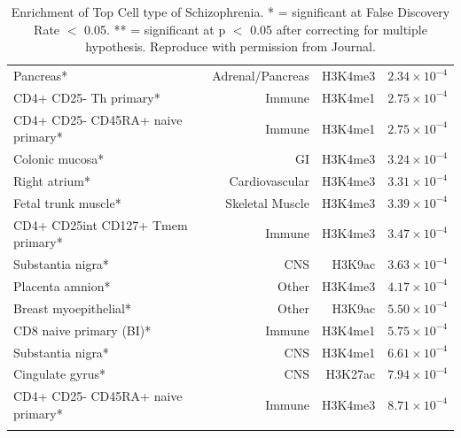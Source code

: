 \documentclass[12pt]{book}
\begin{document}
\begin{singlespace}
\begin{longtable}{p{6cm}rrr}
			Pancreas* & Adrenal/Pancreas & H3K4me3 & $2.34\times 10^{-4}$ \\
			CD4+ CD25- Th primary* & Immune & H3K4me1 & $2.75\times 10^{-4}$ \\
			CD4+ CD25- CD45RA+ naive primary* & Immune & H3K4me1 & $2.75\times 10^{-4}$\\
			Colonic mucosa* & GI    & H3K4me3 & $3.24\times 10^{-4}$ \\
			Right atrium* & Cardiovascular & H3K4me3 & $3.31\times 10^{-4}$ \\
			Fetal trunk muscle* & Skeletal Muscle & H3K4me3 & $3.39\times 10^{-4}$ \\
			CD4+ CD25int CD127+ Tmem primary* & Immune & H3K4me3 & $3.47\times 10^{-4}$ \\
			Substantia nigra* & CNS   & H3K9ac & $3.63\times 10^{-4}$ \\
			Placenta amnion* & Other & H3K4me3 & $4.17\times 10^{-4}$ \\
			Breast myoepithelial* & Other & H3K9ac & $5.50\times 10^{-4}$ \\
			CD8 naive primary (BI)* & Immune & H3K4me1 & $5.75\times 10^{-4}$ \\
			Substantia nigra* & CNS   & H3K4me1 & $6.61\times 10^{-4}$ \\
			Cingulate gyrus* & CNS   & H3K27ac & $7.94\times 10^{-4}$ \\
			CD4+ CD25- CD45RA+ naive primary* & Immune & H3K4me3 & $8.71\times 10^{-4}$ \\
			\bottomrule
		\caption[Enrichment of Top Cell Type of Schizophrenia]{Enrichment of Top Cell type of Schizophrenia.
			* = significant at False Discovery Rate $<$ 0.05.
			** = significant at p $<$ 0.05 after correcting for multiple hypothesis. 
			Reproduce with permission from Journal.\citep{Finucane2015}}
		\label{tab:cellTypeScz}%
	\end{longtable}%
	\end{singlespace}
	
\end{document}
